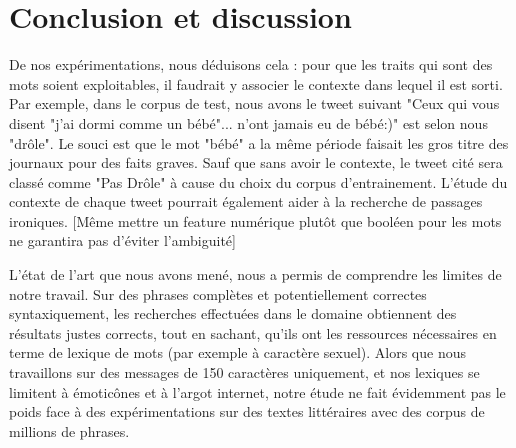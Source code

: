 \documentclass[10pt,a4paper,twoside]{article}
\begin{document}
%



\section{Conclusion et discussion}

De nos expérimentations, nous déduisons cela : pour que les traits qui sont des mots soient exploitables, il faudrait y associer le contexte dans lequel il est sorti. Par exemple, dans le corpus de test, nous avons le tweet suivant "Ceux qui vous disent "j'ai dormi comme un bébé"... n'ont jamais eu de bébé:)" est selon nous "drôle". Le souci est que le mot "bébé" a la même période faisait les gros titre des journaux pour des faits graves. Sauf que sans avoir le contexte, le tweet cité sera classé comme "Pas Drôle" à cause du choix du corpus d'entrainement. L'étude du contexte de chaque tweet pourrait également aider à la recherche de passages ironiques. 
[Même mettre un feature numérique plutôt que booléen pour les mots ne garantira pas d'éviter l'ambiguité]

L'état de l'art que nous avons mené, nous a permis de comprendre les limites de notre travail. Sur des phrases complètes et potentiellement correctes syntaxiquement, les recherches effectuées dans le domaine obtiennent des résultats justes corrects, tout en sachant, qu'ils ont les ressources nécessaires en terme de lexique de mots (par exemple à caractère sexuel). Alors que nous travaillons sur des messages de 150 caractères uniquement, et nos lexiques se limitent à émoticônes et à l'argot internet, notre étude ne fait évidemment pas le poids face à des expérimentations sur des textes littéraires avec des corpus de millions de phrases. 




\nocite{Kiddon11,MihalceaP07}

\end{document}
